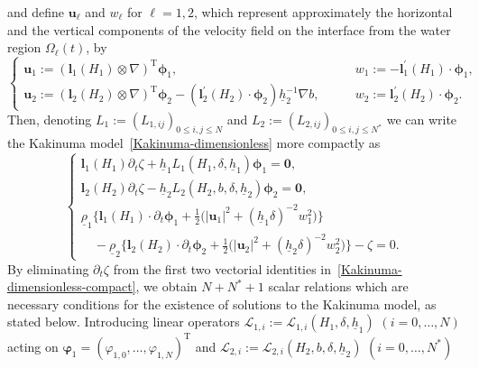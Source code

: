 \documentclass[11pt,leqno]{article}
\numberwithin{equation}{section}
\numberwithin{figure}{section}
\begin{document}
%
and define ${\bm u}_\ell$ and $w_\ell$ for $\ell=1,2$, which represent approximately the horizontal and the vertical components 
of the velocity field on the interface from the water region $\Omega_\ell(t)$, by 
%
\begin{equation}\label{def-uw}
 \left\{\begin{array}{ll}
 \displaystyle {\bm u}_1 := ({\bm l}_1(H_1) \otimes \nabla)^\mathrm{T}{\bm \phi}_{1}, \qquad
  & \displaystyle w_1 := - {\bm l}_1^\prime(H_1) \cdot {\bm\phi}_{1}, \\
 \displaystyle {\bm u}_2 := ({\bm l}_2(H_2) \otimes \nabla)^\mathrm{T}{\bm\phi}_{2}
  - ( {\bm l}_2^\prime(H_2) \cdot {\bm\phi}_{2})\underline{h}_2^{-1}\nabla b, \qquad 
  & \displaystyle w_2 := {\bm l}_2^\prime(H_2) \cdot {\bm\phi}_{2}.
 \end{array}
 \right.
\end{equation}
%
Then, denoting $L_1 := (L_{1,ij})_{0\leq i,j\leq N}$ and $L_2 := (L_{2,ij})_{0\leq i,j\leq N^*}$ 
we can write the Kakinuma model~\eqref{Kakinuma-dimensionless} more compactly as 
%
\begin{equation}\label{Kakinuma-dimensionless-compact} 
\begin{cases}
 \displaystyle
 {\bm l}_1(H_1)\partial_t\zeta + \underline{h}_1 L_1(H_1,\delta,\underline{h}_1){\bm \phi}_1 = {\bm 0}, \\
 \displaystyle
 {\bm l}_2(H_2)\partial_t\zeta - \underline{h}_2 L_2(H_2,b,\delta,\underline{h}_2){\bm \phi}_2 = {\bm 0}, \\
 \underline{\rho}_1\bigl\{ {\bm l}_1(H_1) \cdot \partial_t{\bm \phi}_1 
   + \frac12\bigl( |{\bm u}_1|^2 + (\underline{h}_1\delta)^{-2} w_1^2 \bigr) \bigr\} \\
 \quad
 - \underline{\rho}_2\bigl\{ {\bm l}_2(H_2) \cdot \partial_t{\bm \phi}_2 
  + \frac12\bigl( |{\bm u}_2|^2 +  (\underline{h}_2\delta)^{-2} w_2^2 \bigr) \bigr\} 
 - \zeta = 0. 
\end{cases}
\end{equation}
%
By eliminating $\partial_t\zeta$ from the first two vectorial identities in~\eqref{Kakinuma-dimensionless-compact}, we obtain $N+N^*+1$ scalar relations 
which are necessary conditions for the existence of solutions to the Kakinuma model, as stated below. 
Introducing linear operators $\mathcal{L}_{1,i} := \mathcal{L}_{1,i}(H_1,\delta,\underline{h}_1)$ $(i=0,\ldots,N)$ 
acting on ${\bm \varphi}_1 = (\varphi_{1,0},\ldots,\varphi_{1,N})^\mathrm{T}$ and 
$\mathcal{L}_{2,i} := \mathcal{L}_{2,i}(H_2,b,\delta,\underline{h}_2)$ $(i=0,\ldots,N^*)$ 
\end{document}
